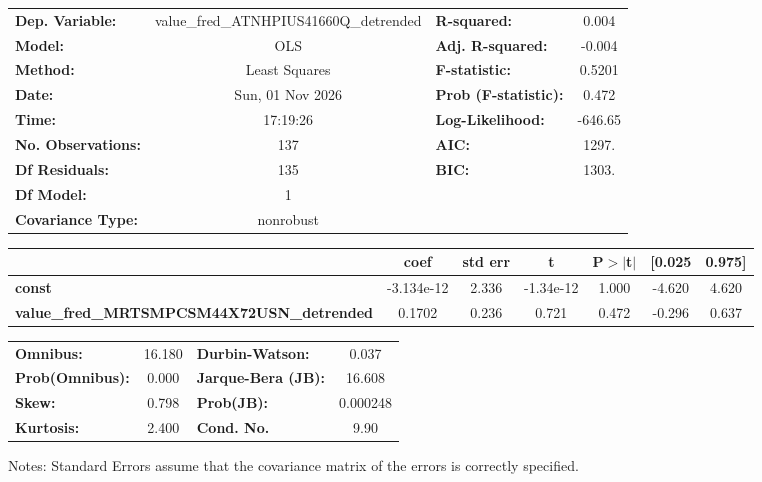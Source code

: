\begin{center}
\begin{tabular}{lclc}
\toprule
\textbf{Dep. Variable:}                            & value\_fred\_ATNHPIUS41660Q\_detrended & \textbf{  R-squared:         } &     0.004   \\
\textbf{Model:}                                    &                  OLS                   & \textbf{  Adj. R-squared:    } &    -0.004   \\
\textbf{Method:}                                   &             Least Squares              & \textbf{  F-statistic:       } &    0.5201   \\
\textbf{Date:}                                     &            Sun, 01 Nov 2026            & \textbf{  Prob (F-statistic):} &    0.472    \\
\textbf{Time:}                                     &                17:19:26                & \textbf{  Log-Likelihood:    } &   -646.65   \\
\textbf{No. Observations:}                         &                    137                 & \textbf{  AIC:               } &     1297.   \\
\textbf{Df Residuals:}                             &                    135                 & \textbf{  BIC:               } &     1303.   \\
\textbf{Df Model:}                                 &                      1                 & \textbf{                     } &             \\
\textbf{Covariance Type:}                          &               nonrobust                & \textbf{                     } &             \\
\bottomrule
\end{tabular}
\begin{tabular}{lcccccc}
                                                   & \textbf{coef} & \textbf{std err} & \textbf{t} & \textbf{P$> |$t$|$} & \textbf{[0.025} & \textbf{0.975]}  \\
\midrule
\textbf{const}                                     &   -3.134e-12  &        2.336     & -1.34e-12  &         1.000        &       -4.620    &        4.620     \\
\textbf{value\_fred\_MRTSMPCSM44X72USN\_detrended} &       0.1702  &        0.236     &     0.721  &         0.472        &       -0.296    &        0.637     \\
\bottomrule
\end{tabular}
\begin{tabular}{lclc}
\textbf{Omnibus:}       & 16.180 & \textbf{  Durbin-Watson:     } &    0.037  \\
\textbf{Prob(Omnibus):} &  0.000 & \textbf{  Jarque-Bera (JB):  } &   16.608  \\
\textbf{Skew:}          &  0.798 & \textbf{  Prob(JB):          } & 0.000248  \\
\textbf{Kurtosis:}      &  2.400 & \textbf{  Cond. No.          } &     9.90  \\
\bottomrule
\end{tabular}
\end{center}

Notes: \newline
 [1] Standard Errors assume that the covariance matrix of the errors is correctly specified.